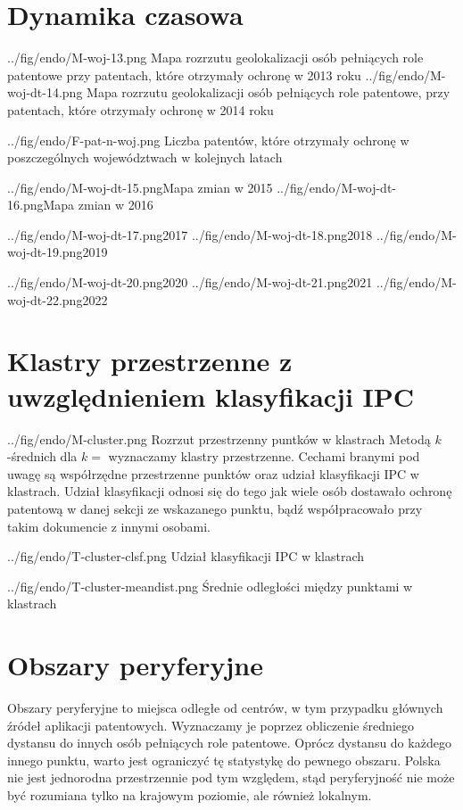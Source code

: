 \section{Dynamika czasowa}


  \figsides
{../fig/endo/M-woj-13.png}
{ Mapa rozrzutu geolokalizacji osób pełniących role patentowe 
  przy patentach, które otrzymały ochronę w 2013 roku}
{../fig/endo/M-woj-dt-14.png}
{ Mapa rozrzutu geolokalizacji osób pełniących role patentowe, 
  przy patentach, które otrzymały ochronę w 2014 roku}

{../fig/endo/F-pat-n-woj.png}
{ Liczba patentów, które otrzymały ochronę w poszczególnych województwach 
  w kolejnych latach }

  \newpage\figsides
{../fig/endo/M-woj-dt-15.png}{Mapa zmian w 2015}
{../fig/endo/M-woj-dt-16.png}{Mapa zmian w 2016}

  \figsidesTri
{../fig/endo/M-woj-dt-17.png}{2017}
{../fig/endo/M-woj-dt-18.png}{2018}
{../fig/endo/M-woj-dt-19.png}{2019}

  \figsidesTri
{../fig/endo/M-woj-dt-20.png}{2020}
{../fig/endo/M-woj-dt-21.png}{2021}
{../fig/endo/M-woj-dt-22.png}{2022}


\newpage
\section{Klastry przestrzenne z uwzględnieniem klasyfikacji \ac{IPC}}

\figside
  {../fig/endo/M-cluster.png}
    {Rozrzut przestrzenny puntków w klastrach}
{
  Metodą $k$-średnich dla $k=$ wyznaczamy klastry przestrzenne. 
  Cechami branymi pod uwagę są współrzędne przestrzenne punktów oraz
  udział klasyfikacji \ac{IPC} w klastrach. Udział klasyfikacji
  odnosi się do tego jak wiele osób dostawało ochronę patentową
  w danej sekcji ze wskazanego punktu, bądź współpracowało przy
  takim dokumencie z innymi osobami.
}

\tblside
  {../fig/endo/T-cluster-clsf.png}
    {Udział klasyfikacji \ac{IPC} w klastrach}

\tblside
  {../fig/endo/T-cluster-meandist.png}
    {Średnie odległości między punktami w klastrach}



\newpage
\section{Obszary peryferyjne}

Obszary peryferyjne to miejsca odległe od centrów, w tym przypadku
głównych źródeł aplikacji patentowych. Wyznaczamy je poprzez obliczenie
średniego dystansu do innych osób pełniących role patentowe.
Oprócz dystansu do każdego innego punktu, warto jest ograniczyć
tę statystykę do pewnego obszaru. Polska nie jest jednorodna przestrzennie 
pod tym względem, stąd peryferyjność nie może być rozumiana tylko 
na krajowym poziomie, ale również lokalnym.

